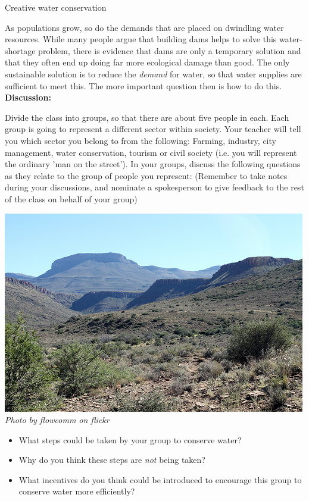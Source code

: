             \begin{groupdiscussion}{ Creative water conservation
}
            \nopagebreak

\label{m38138*uid289435}As populations grow, so do the demands that are placed on dwindling water resources. While many people argue that building dams helps to solve this water-shortage problem, there is evidence that dams are only a temporary solution and that they often end up doing far more ecological damage than good. The only sustainable solution is to reduce the \textsl{demand} for water, so that water supplies are sufficient to meet this. The more important question then is how to do this.\\
\label{m38138*uid5630}\textbf{Discussion:}
\begin{minipage}{.6\textwidth}
    Divide the class into groups, so that there are about five people in each. Each group is going to represent a different sector within society. Your teacher will tell you which sector you belong to from the following: Farming, industry, city management, water conservation, tourism or civil society (i.e. you will represent the ordinary 'man on the street'). In your groups, discuss the following questions as they relate to the group of people you represent: (Remember to take notes during your discussions, and nominate a spokesperson to give feedback to the rest of the class on behalf of your group)
\end{minipage}
\begin{minipage}{.4\textwidth}
 \begin{center}
  \includegraphics[width=.6\textwidth]{photos/karoo_flowcomm.jpg} \\
\textsl{Photo by flowcomm on flickr}
 \end{center}

\end{minipage}
\label{m38138*id342317}\begin{itemize}[noitemsep]
            \label{m38138*uid88}\item What steps could be taken by your group to conserve water?
\label{m38138*uid89}\item Why do you think these steps are \textsl{not} being taken?
\label{m38138*uid90}\item What incentives do you think could be introduced to encourage this group to conserve water more efficiently?
\end{itemize}


\end{groupdiscussion}
